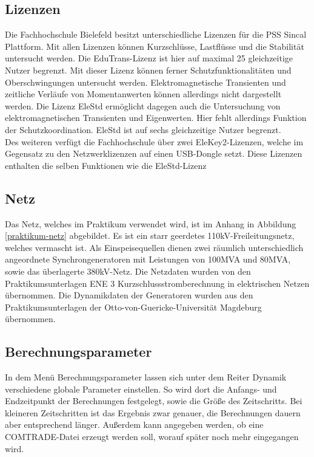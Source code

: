 \documentclass{scrartcl}
\begin{document}
\begin{onehalfspace}
\subsection{Lizenzen}
Die Fachhochschule Bielefeld besitzt unterschiedliche Lizenzen für die PSS Sincal Plattform. Mit allen Lizenzen können Kurzschlüsse, Lastflüsse und die Stabilität untersucht werden. Die EduTrans-Lizenz ist hier auf maximal 25 gleichzeitige Nutzer begrenzt. Mit dieser Lizenz können ferner Schutzfunktionalitäten und Oberschwingungen untersucht werden. Elektromagnetische Transienten und zeitliche Verläufe von Momentanwerten können allerdings nicht dargestellt werden. Die Lizenz EleStd ermöglicht dagegen auch die Untersuchung von elektromagnetischen Transienten und Eigenwerten. Hier fehlt allerdings Funktion der Schutzkoordination. EleStd ist auf sechs gleichzeitige Nutzer begrenzt. \\
Des weiteren verfügt die Fachhochschule über zwei EleKey2-Lizenzen, welche im Gegensatz zu den Netzwerklizenzen auf einen USB-Dongle setzt. Diese Lizenzen enthalten die selben Funktionen wie die EleStd-Lizenz

\subsection{Netz}
Das Netz, welches im Praktikum verwendet wird, ist im Anhang in Abbildung \ref{praktikum-netz} abgebildet. Es ist ein starr geerdetes 110kV-Freileitungsnetz, welches vermascht ist. Als Einspeisequellen dienen zwei räumlich unterschiedlich angeordnete Synchrongeneratoren mit Leistungen von 100MVA und 80MVA, sowie das überlagerte 380kV-Netz. Die Netzdaten wurden von den Praktikumsunterlagen \glqq ENE 3 Kurzschlussstromberechnung in elektrischen Netzen\grqq{} übernommen. Die Dynamikdaten der Generatoren wurden aus den Praktikumsunterlagen der Otto-von-Guericke-Universität Magdeburg übernommen.

\subsection{Berechnungsparameter}
In dem Menü \glqq Berechnungsparameter\grqq{} lassen sich unter dem Reiter \glqq Dynamik\grqq{} verschiedene globale Parameter einstellen. So wird dort die Anfangs- und Endzeitpunkt der Berechnungen festgelegt, sowie die Größe des Zeitschritts. Bei kleineren Zeitschritten ist das Ergebnis zwar genauer, die Berechnungen dauern aber entsprechend länger. Außerdem kann angegeben werden, ob eine COMTRADE-Datei erzeugt werden soll, worauf später noch mehr eingegangen wird.


\end{onehalfspace}
\end{document}
